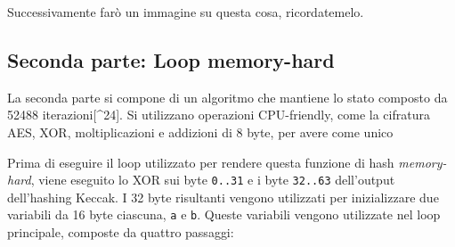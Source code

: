 Successivamente farò un immagine su questa cosa, ricordatemelo.

\subsection{Seconda parte: Loop
memory-hard}\label{seconda-parte-loop-memory-hard}

La seconda parte si compone di un algoritmo che mantiene lo stato
composto da 52488 iterazioni{[}\^{}24{]}. Si utilizzano operazioni
CPU-friendly, come la cifratura AES, XOR, moltiplicazioni e addizioni di
8 byte, per avere come unico

Prima di eseguire il loop utilizzato per rendere questa funzione di hash
\emph{memory-hard}, viene eseguito lo XOR sui byte \texttt{0..31} e i
byte \texttt{32..63} dell'output dell'hashing Keccak. I 32 byte
risultanti vengono utilizzati per inizializzare due variabili da 16 byte
ciascuna, \texttt{a} e \texttt{b}. Queste variabili vengono utilizzate
nel loop principale, composte da quattro passaggi:


